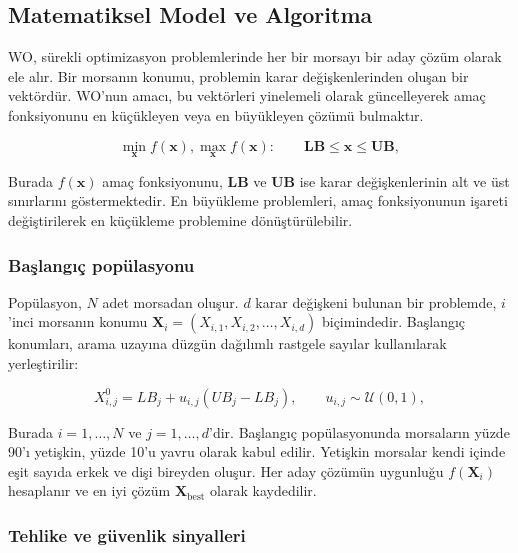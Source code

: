 \subsection{Matematiksel Model ve Algoritma}

WO, sürekli optimizasyon problemlerinde her bir
morsayı bir aday çözüm olarak ele alır. Bir morsanın konumu,
problemin karar değişkenlerinden oluşan bir vektördür. WO'nun amacı,
bu vektörleri yinelemeli olarak güncelleyerek amaç fonksiyonunu en
küçükleyen veya en büyükleyen çözümü bulmaktır.

\begin{equation}
    \min_{\mathbf{x}} f(\mathbf{x}),
    \max_{\mathbf{x}} f(\mathbf{x}):
    \qquad
    \mathbf{LB} \leq \mathbf{x} \leq \mathbf{UB},
    \label{eq:wo_problem}
\end{equation}

Burada $f(\mathbf{x})$ amaç fonksiyonunu, $\mathbf{LB}$ ve
$\mathbf{UB}$ ise karar değişkenlerinin alt ve üst sınırlarını
göstermektedir. En büyükleme problemleri, amaç fonksiyonunun işareti
değiştirilerek en küçükleme problemine dönüştürülebilir.

\subsubsection{Başlangıç popülasyonu}

Popülasyon, $N$ adet morsadan oluşur. $d$ karar değişkeni bulunan bir
problemde, $i$'inci morsanın konumu
$\mathbf{X}_i=(X_{i,1},X_{i,2},\ldots,X_{i,d})$ biçimindedir.
Başlangıç konumları, arama uzayına düzgün dağılımlı rastgele sayılar
kullanılarak yerleştirilir:

\begin{equation}
    X_{i,j}^{0}
    =
    LB_j + u_{i,j}(UB_j-LB_j),
    \qquad
    u_{i,j}\sim\mathcal{U}(0,1),
    \label{eq:wo_initialization}
\end{equation}

Burada $i=1,\ldots,N$ ve $j=1,\ldots,d$'dir. Başlangıç popülasyonunda
morsaların yüzde 90'ı yetişkin, yüzde 10'u yavru olarak kabul edilir.
Yetişkin morsalar kendi içinde eşit sayıda erkek ve dişi bireyden
oluşur. Her aday çözümün uygunluğu $f(\mathbf{X}_i)$ hesaplanır ve
en iyi çözüm $\mathbf{X}_{\mathrm{best}}$ olarak kaydedilir.

\subsubsection{Tehlike ve güvenlik sinyalleri}

